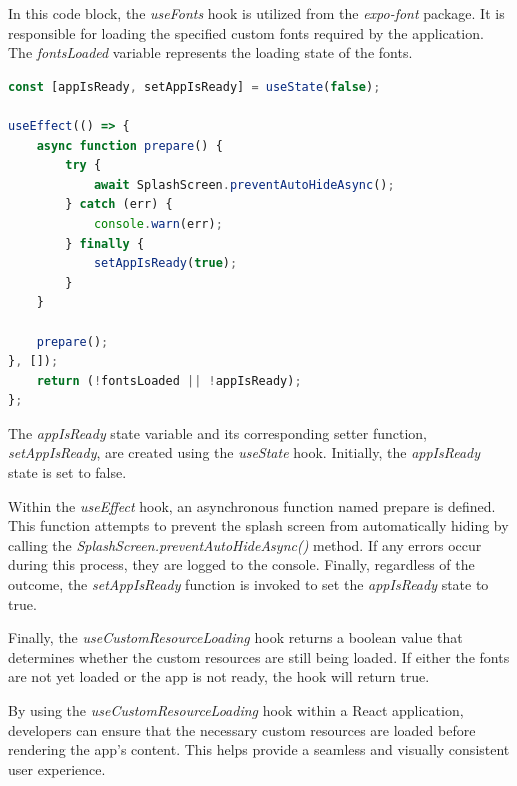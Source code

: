 In this code block, the \textit{useFonts} hook is utilized from the \textit{expo-font} package. It is responsible for loading the specified custom fonts required by the application. The \textit{fontsLoaded} variable represents the loading state of the fonts.


\begin{lstlisting}[language=TypeScript]
const [appIsReady, setAppIsReady] = useState(false);

useEffect(() => {
    async function prepare() {
        try {
            await SplashScreen.preventAutoHideAsync();
        } catch (err) {
            console.warn(err);
        } finally {
            setAppIsReady(true);
        }
    }

    prepare();
}, []);
    return (!fontsLoaded || !appIsReady);
};
\end{lstlisting}


The \textit{appIsReady} state variable and its corresponding setter function, \textit{setAppIsReady}, are created using the \textit{useState} hook. Initially, the \textit{appIsReady} state is set to false.

Within the \textit{useEffect} hook, an asynchronous function named prepare is defined. This function attempts to prevent the splash screen from automatically hiding by calling the \textit{SplashScreen.preventAutoHideAsync()} method. If any errors occur during this process, they are logged to the console. Finally, regardless of the outcome, the \textit{setAppIsReady} function is invoked to set the \textit{appIsReady} state to true.




Finally, the \textit{useCustomResourceLoading} hook returns a boolean value that determines whether the custom resources are still being loaded. If either the fonts are not yet loaded or the app is not ready, the hook will return true.

By using the \textit{useCustomResourceLoading} hook within a React application, developers can ensure that the necessary custom resources are loaded before rendering the app's content. This helps provide a seamless and visually consistent user experience.

